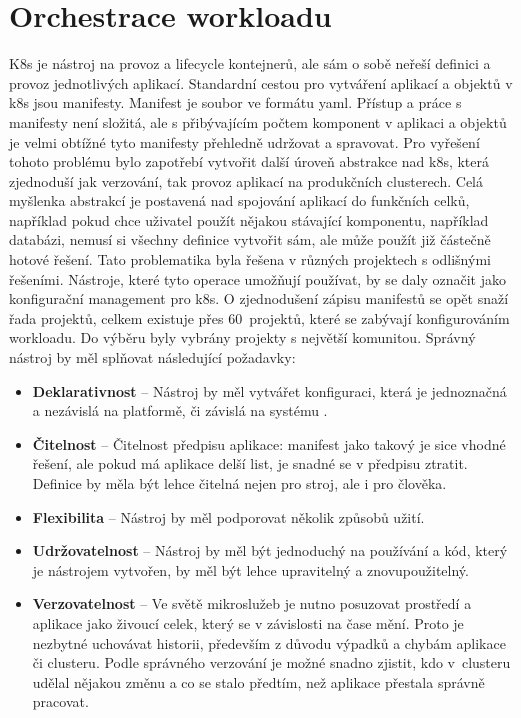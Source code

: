\section{Orchestrace workloadu}
K8s je nástroj na provoz a lifecycle kontejnerů, ale sám o sobě neřeší definici a provoz jednotlivých aplikací. Standardní cestou pro vytváření aplikací a objektů v k8s jsou manifesty. Manifest je soubor ve formátu yaml. Přístup a práce s manifesty není složitá, ale s přibývajícím počtem komponent v aplikaci a objektů je velmi obtížné tyto manifesty přehledně udržovat a spravovat. Pro vyřešení tohoto problému bylo zapotřebí vytvořit další úroveň abstrakce nad k8s, která zjednoduší jak verzování, tak provoz aplikací na produkčních clusterech. Celá myšlenka abstrakcí je postavená nad spojování aplikací do funkčních celků, například pokud chce uživatel použít nějakou stávající komponentu, například databázi, nemusí si všechny definice vytvořit sám, ale může použít již částečně hotové řešení. Tato problematika byla řešena v různých projektech s odlišnými řešeními. Nástroje, které tyto operace umožňují používat, by se daly označit jako konfigurační management pro k8s. O zjednodušení zápisu manifestů se opět snaží řada projektů, celkem existuje přes 60 projektů, které se zabývají konfigurováním workloadu. Do výběru byly vybrány projekty s největší komunitou. Správný nástroj by měl splňovat následující požadavky:
\begin{itemize}
    \item \textbf{Deklarativnost} – Nástroj by měl vytvářet konfiguraci, která je jednoznačná a nezávislá na platformě, či závislá na systému \cite{k8s_DAM}.
    \item \textbf{Čitelnost} – Čitelnost předpisu aplikace: manifest jako takový je sice vhodné řešení, ale pokud má aplikace delší list, je snadné se v předpisu ztratit. Definice by měla být lehce čitelná nejen pro stroj, ale i pro člověka.
    \item \textbf{Flexibilita} – Nástroj by měl podporovat několik způsobů užití.
    \item \textbf{Udržovatelnost} – Nástroj by měl být jednoduchý na používání a kód, který je nástrojem vytvořen, by měl být lehce upravitelný a znovupoužitelný.
    \item \textbf{Verzovatelnost} – Ve světě mikroslužeb je nutno posuzovat prostředí a aplikace jako živoucí celek, který se v závislosti na čase mění. Proto je nezbytné uchovávat historii, především z důvodu výpadků a chybám aplikace či clusteru. Podle správného verzování je možné snadno zjistit, kdo v clusteru udělal nějakou změnu a co se stalo předtím, než aplikace přestala správně pracovat.
\end{itemize}

